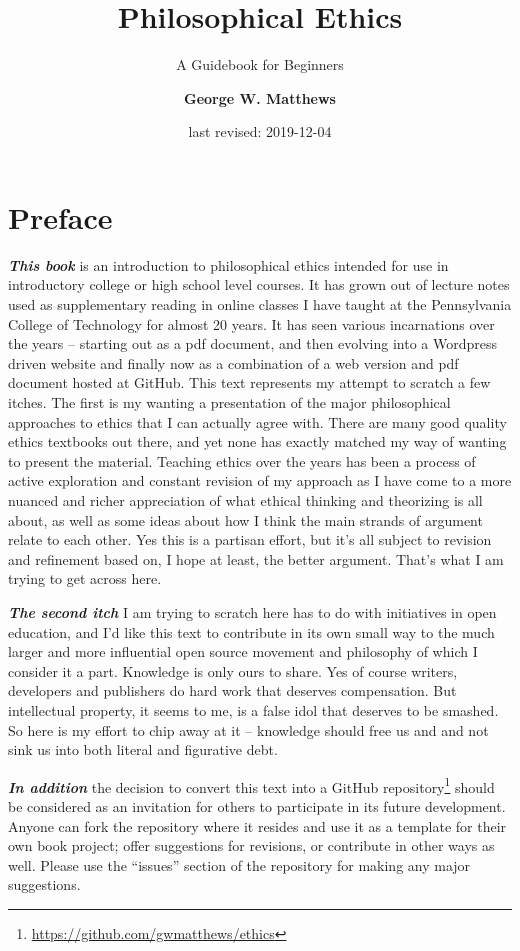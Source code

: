 \documentclass[]{book}
\title{Philosophical Ethics}
\subtitle{A Guidebook for Beginners}
\author{\textbf{George W. Matthews}}
\date{last revised: 2019-12-04}
\renewcommand{\href}[2]{#2\footnote{\url{#1}}}
\begin{document}
\maketitle

{
\setcounter{tocdepth}{2}
\tableofcontents
}
\hypertarget{preface}{%
\chapter*{Preface}\label{preface}}


\textbf{\emph{This book}} is an introduction to philosophical ethics intended for use in introductory college or high school level courses. It has grown out of lecture notes used as supplementary reading in online classes I have taught at the Pennsylvania College of Technology for almost 20 years. It has seen various incarnations over the years -- starting out as a pdf document, and then evolving into a Wordpress driven website and finally now as a combination of a web version and pdf document hosted at GitHub. This text represents my attempt to scratch a few itches. The first is my wanting a presentation of the major philosophical approaches to ethics that I can actually agree with. There are many good quality ethics textbooks out there, and yet none has exactly matched my way of wanting to present the material. Teaching ethics over the years has been a process of active exploration and constant revision of my approach as I have come to a more nuanced and richer appreciation of what ethical thinking and theorizing is all about, as well as some ideas about how I think the main strands of argument relate to each other. Yes this is a partisan effort, but it's all subject to revision and refinement based on, I hope at least, the better argument. That's what I am trying to get across here.

\textbf{\emph{The second itch}} I am trying to scratch here has to do with initiatives in open education, and I'd like this text to contribute in its own small way to the much larger and more influential open source movement and philosophy of which I consider it a part. Knowledge is only ours to share. Yes of course writers, developers and publishers do hard work that deserves compensation. But intellectual property, it seems to me, is a false idol that deserves to be smashed. So here is my effort to chip away at it -- knowledge should free us and and not sink us into both literal and figurative debt.

\textbf{\emph{In addition}} the decision to convert this text into a \href{https://github.com/gwmatthews/ethics}{GitHub repository} should be considered as an invitation for others to participate in its future development. Anyone can fork the repository where it resides and use it as a template for their own book project; offer suggestions for revisions, or contribute in other ways as well. Please use the ``issues'' section of the repository for making any major suggestions.
\end{document}
